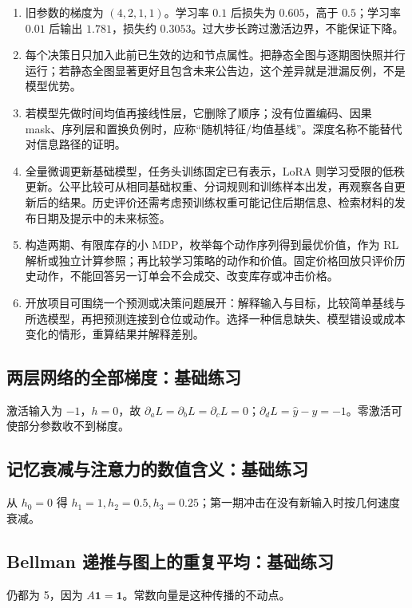 \begin{enumerate}[leftmargin=*]
  \item 旧参数的梯度为 $(4,2,1,1)$。学习率 $0.1$ 后损失为 $0.605$，高于 $0.5$；学习率 $0.01$ 后输出 $1.781$，损失约 $0.3053$。过大步长跨过激活边界，不能保证下降。
  \item 每个决策日只加入此前已生效的边和节点属性。把静态全图与逐期图快照并行运行；若静态全图显著更好且包含未来公告边，这个差异就是泄漏反例，不是模型优势。
  \item 若模型先做时间均值再接线性层，它删除了顺序；没有位置编码、因果 mask、序列层和置换负例时，应称“随机特征/均值基线”。深度名称不能替代对信息路径的证明。
  \item 全量微调更新基础模型，任务头训练固定已有表示，LoRA 则学习受限的低秩更新。公平比较可从相同基础权重、分词规则和训练样本出发，再观察各自更新后的结果。历史评价还需考虑预训练权重可能记住后期信息、检索材料的发布日期及提示中的未来标签。
  \item 构造两期、有限库存的小 MDP，枚举每个动作序列得到最优价值，作为 RL 解析或独立计算参照；再比较学习策略的动作和价值。固定价格回放只评价历史动作，不能回答另一订单会不会成交、改变库存或冲击价格。
  \item 开放项目可围绕一个预测或决策问题展开：解释输入与目标，比较简单基线与所选模型，再把预测连接到仓位或动作。选择一种信息缺失、模型错设或成本变化的情形，重算结果并解释差别。
\end{enumerate}

\subsection*{两层网络的全部梯度：基础练习}
激活输入为 $-1$，$h=0$，故 $\partial_aL=\partial_bL=\partial_cL=0$；$\partial_dL=\hat y-y=-1$。零激活可使部分参数收不到梯度。

\subsection*{记忆衰减与注意力的数值含义：基础练习}
从 $h_0=0$ 得 $h_1=1,h_2=0.5,h_3=0.25$；第一期冲击在没有新输入时按几何速度衰减。

\subsection*{Bellman 递推与图上的重复平均：基础练习}
仍都为 5，因为 $A\mathbf1=\mathbf1$。常数向量是这种传播的不动点。
